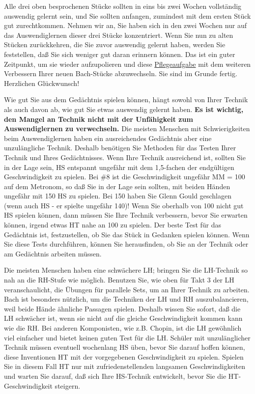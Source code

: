Alle drei oben besprochenen Stücke sollten in eins bis zwei Wochen vollständig auswendig gelernt sein, und Sie sollten anfangen, zumindest mit dem ersten Stück gut zurechtkommen.
Nehmen wir an, Sie haben sich in den zwei Wochen nur auf das Auswendiglernen dieser drei Stücke konzentriert.
Wenn Sie nun zu alten Stücken zurückkehren, die Sie zuvor auswendig gelernt haben, werden Sie feststellen, daß Sie sich weniger gut daran erinnern können.
Das ist ein guter Zeitpunkt, um sie wieder aufzupolieren und diese \hyperref[c1iii6f]{Pflegeaufgabe} mit dem weiteren Verbessern Ihrer neuen Bach-Stücke abzuwechseln.
Sie sind im Grunde fertig.
Herzlichen Glückwunsch!

Wie gut Sie aus dem Gedächtnis spielen können, hängt sowohl von Ihrer Technik als auch davon ab, wie gut Sie etwas auswendig gelernt haben.
\textbf{Es ist wichtig, den Mangel an Technik nicht mit der Unfähigkeit zum Auswendiglernen zu verwechseln.}
Die meisten Menschen mit Schwierigkeiten beim Auswendiglernen haben ein ausreichendes Gedächtnis aber eine unzulängliche Technik.
Deshalb benötigen Sie Methoden für das Testen Ihrer Technik und Ihres Gedächtnisses.
Wenn Ihre Technik ausreichend ist, sollten Sie in der Lage sein, HS entspannt ungefähr mit dem 1,5-fachen der endgültigen Geschwindigkeit zu spielen.
Bei \#8 ist die Geschwindigkeit ungefähr MM = 100 auf dem Metronom, so daß Sie in der Lage sein sollten, mit beiden Händen ungefähr mit 150 HS zu spielen.
Bei 150 haben Sie Glenn Gould geschlagen (wenn auch HS - er spielte ungefähr 140)!
Wenn Sie oberhalb von 100 nicht gut HS spielen können, dann müssen Sie Ihre Technik verbessern, bevor Sie erwarten können, irgend etwas HT nahe an 100 zu spielen.
Der beste Test für das Gedächtnis ist, festzustellen, ob Sie das Stück in Gedanken spielen können.
Wenn Sie diese Tests durchführen, können Sie herausfinden, ob Sie an der Technik oder am Gedächtnis arbeiten müssen.

Die meisten Menschen haben eine schwächere LH; bringen Sie die LH-Technik so nah an die RH-Stufe wie möglich.
Benutzen Sie, wie oben für Takt 3 der LH veranschaulicht, die Übungen für parallele Sets, um an Ihrer Technik zu arbeiten.
Bach ist besonders nützlich, um die Techniken der LH und RH auszubalancieren, weil beide Hände ähnliche Passagen spielen.
Deshalb wissen Sie sofort, daß die LH schwächer ist, wenn sie nicht auf die gleiche Geschwindigkeit kommen kann wie die RH.
Bei anderen Komponisten, wie z.B. Chopin, ist die LH gewöhnlich viel einfacher und bietet keinen guten Test für die LH.
Schüler mit unzulänglicher Technik müssen eventuell wochenlang HS üben, bevor Sie darauf hoffen können, diese Inventionen HT mit der vorgegebenen Geschwindigkeit zu spielen.
Spielen Sie in diesem Fall HT nur mit zufriedenstellenden langsamen Geschwindigkeiten und warten Sie darauf, daß sich Ihre HS-Technik entwickelt, bevor Sie die HT-Geschwindigkeit steigern.

